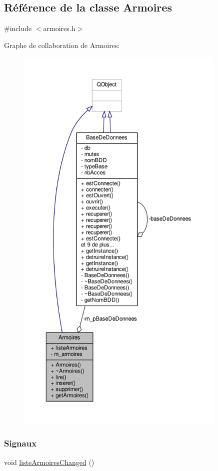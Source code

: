\hypertarget{class_armoires}{}\subsection{Référence de la classe Armoires}
\label{class_armoires}


{\ttfamily \#include $<$armoires.\+h$>$}



Graphe de collaboration de Armoires\+:\nopagebreak
\begin{figure}[H]
\begin{center}
\leavevmode
\includegraphics[height=550pt]{class_armoires__coll__graph}
\end{center}
\end{figure}
\subsubsection*{Signaux}
\begin{DoxyCompactItemize}
\item 
void \hyperlink{class_armoires_a5d1b239d24b608ce8f41677d0fbe3507}{liste\+Armoires\+Changed} ()
\end{DoxyCompactItemize}
